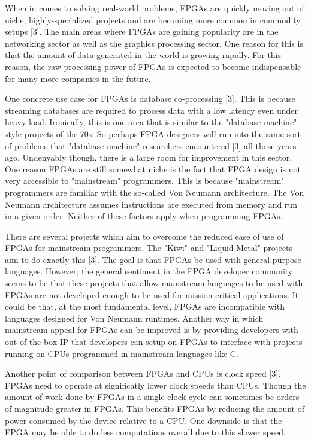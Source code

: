 \documentclass{article}
\begin{document}
    When in comes to solving real-world problems, FPGAs are quickly moving out of niche,
    highly-specialized projects and are becoming more common in commodity setups [3].
    The main areas where FPGAs are gaining popularity are in the networking sector
    as well as the graphics processing sector. One reason for this is that the amount
    of data generated in the world is growing rapidly. For this reason, the raw processing
    power of FPGAs is expected to become indispensable for many more companies in the future.

    One concrete use case for FPGAs is database co-processing [3]. This is because
    streaming databases are required to process data with a low latency even under heavy
    load. Ironically, this is one area that is similar to the "database-machine" style
    projects of the 70s. So perhaps FPGA designers will run into the same sort of
    problems that "database-machine" researchers encountered [3] all those years ago.
    Undenyably though, there is a large room for improvement in this sector.
    One reason FPGAs are still somewhat niche is the fact that FPGA design is not
    very accessible to "mainstream" programmers. This is because "mainstream" programmers
    are familiar with the so-called Von Neumann architecture. The Von Neumann architecture
    assumes instructions are executed from memory and run in a given order. Neither of these
    factors apply when programming FPGAs.

    There are several projects which aim to overcome the reduced ease of use of FPGAs
    for mainstream programmers. The "Kiwi" and "Liquid Metal" projects aim to do exactly
    this [3]. The goal is that FPGAs be used with general purpose languages.
    However, the general sentiment in the FPGA developer community seems to be that these
    projects that allow mainstream languages to be used with FPGAs are not developed
    enough to be used for mission-critical applications.
    It could be that, at the most fundamental level, FPGAs are incompatible with languages
    designed for Von Neumann runtimes.
    Another way in which mainstream appeal for FPGAs can be improved is by
    providing developers with out of the box IP that developers can setup on FPGAs to interface
    with projects running on CPUs programmed in mainstream languages like C.

    Another point of comparison between FPGAs and CPUs is clock speed [3]. FPGAs need to operate
    at significatly lower clock speeds than CPUs. Though the amount of work done by FPGAs
    in a single clock cycle can sometimes be orders of magnitude greater in FPGAs. This benefits
    FPGAs by reducing the amount of power consumed by the device relative to a CPU. One downside
    is that the FPGA may be able to do less computations overall due to this slower speed.
\end{document}
